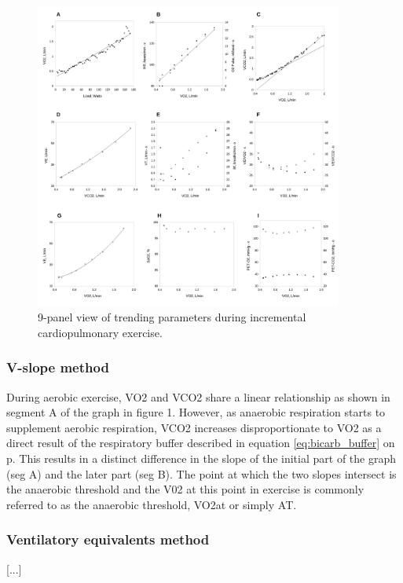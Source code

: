 \begin{figure}[p]
	\centering
	\includegraphics[width=0.9\textwidth]{Figures/cpet_9panel.pdf}
	\caption{9-panel view of trending parameters during incremental cardiopulmonary exercise.}
	\label{fig:cpet_9panel}
\end{figure}


\subsubsection{V-slope method}

During aerobic exercise, VO2 and VCO2 share a linear relationship as shown in segment A of the graph in figure 1. However, as anaerobic respiration starts to supplement aerobic respiration, VCO2 increases disproportionate to VO2 as a direct result of the respiratory buffer described in equation \ref{eq:bicarb_buffer} on p\pageref{eq:bicarb_buffer}. This results in a distinct difference in the slope of the initial part of the graph (seg A) and the later part (seg B). The point at which the two slopes intersect is the anaerobic threshold and the V02 at this point in exercise is commonly referred to as the anaerobic threshold, VO2at or simply AT. 


\subsubsection{Ventilatory equivalents method}
[...] 

